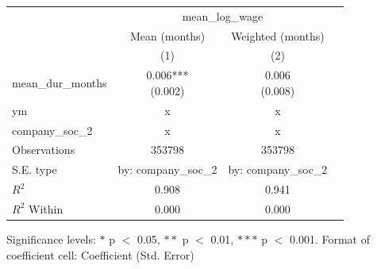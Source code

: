 \renewcommand\cellalign{t}
\begin{threeparttable}
\begin{tabular}{lccc}
\toprule
 & \multicolumn{2}{c}{mean_log_wage} \\
\cmidrule(lr){2-3} 
 & Mean (months) & Weighted (months) \\
 & (1) & (2) \\
\midrule
\addlinespace
mean_dur_months & \makecell{0.006*** \\ (0.002)} & \makecell{0.006 \\ (0.008)} \\
\midrule
\addlinespace
ym & x & x \\
company_soc_2 & x & x \\
\midrule
\addlinespace
Observations & 353798 & 353798 \\
S.E. type & by: company_soc_2 & by: company_soc_2 \\
$R^2$ & 0.908 & 0.941 \\
$R^2$ Within & 0.000 & 0.000 \\
\bottomrule
\end{tabular}
\footnotesize Significance levels: $*$ p $<$ 0.05, $**$ p $<$ 0.01, $***$ p $<$ 0.001. Format of coefficient cell: Coefficient 
 (Std. Error)
\end{threeparttable}